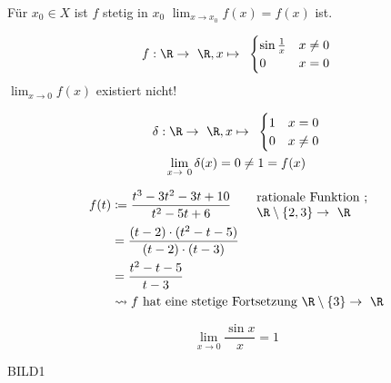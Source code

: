 \begin{fakt}
	Für $x_0 \in X$ ist $f$ stetig in $x_0$ \gdw $\lim_{x \rightarrow x_0} f(x) = f(x)$ ist.
\end{fakt}
\begin{bsp*}
	\[ f: \R \rightarrow \R , x \mapsto \begin{cases}
		\sin \frac{1}{x}	&x \neq 0	\\
		0			&x = 0	
	\end{cases} \]
	$\lim_{x \rightarrow 0} f(x)$ existiert nicht!
\end{bsp*}
\begin{bsp*}
	\begin{gather*}
		\delta : \R \rightarrow \R , x \mapsto \begin{cases}
			1	&x = 0	\\
			0	&x \neq 0	
		\end{cases} \\
		\lim_{x \rightarrow 0} \delta(x) = 0 \neq 1 = f(x)
	\end{gather*}
\end{bsp*}
\begin{bsp*}
	\[ \begin{split}
		f(t)	&\coloneqq \frac{t^3 - 3t^2 -3t + 10}{t^2 - 5t + 6} \qquad \begin{matrix*}[l] \text{rationale Funktion } ; \\ \R \setminus \{ 2,3 \} \rightarrow \R \end{matrix*} \\
			&= \frac{(t-2) \cdot (t^2 - t -5)}{(t-2) \cdot (t-3)} \\
			&= \frac{t^2 - t - 5}{t-3} \\
			&\rightsquigarrow f \text{ hat eine stetige Fortsetzung } \R \setminus \{ 3 \} \rightarrow \R
	\end{split} \]
\end{bsp*}
\begin{bsp*}
	\[ \lim_{x \rightarrow 0} \frac{\sin x}{x} = 1 \]
	\begin{bew}[head = Geometrische Beweisidee:]
		BILD1
	\end{bew}
\end{bsp*}

